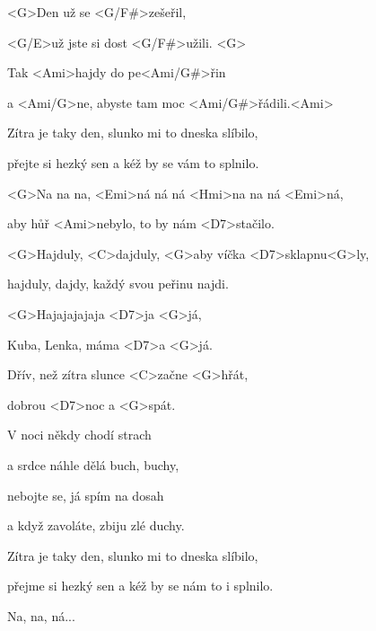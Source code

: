 

\zs
<G>Den už se <G/F#>zešeřil,

<G/E>už jste si dost <G/F#>užili. <G>

Tak <Ami>hajdy do pe<Ami/G#>řin

a <Ami/G>ne, abyste tam moc <Ami/G#>řádili.<Ami>

Zítra je taky den, slunko mi to dneska slíbilo,

přejte si hezký sen a kéž by se vám to splnilo.

<G>Na na na, <Emi>ná ná ná <Hmi>na na ná <Emi>ná,

aby hůř <Ami>nebylo, to by nám <D7>stačilo.
\ks

\zr
<G>Hajduly, <C>dajduly, <G>aby víčka 
<D7>sklapnu<G>ly, 

hajduly, dajdy, každý svou peřinu najdi.

<G>Hajajajajaja <D7>ja <G>já,

Kuba, Lenka, máma <D7>a <G>já.

Dřív, než zítra slunce <C>začne <G>hřát,

dobrou <D7>noc a <G>spát.
\kr

\zs
V noci někdy chodí strach

a srdce náhle dělá buch, buchy,

nebojte se, já spím na dosah

a když zavoláte, zbiju zlé duchy.

Zítra je taky den, slunko mi to dneska slíbilo,

přejme si hezký sen a kéž by se nám to i splnilo.

Na, na, ná...
\ks

\zr\kr

\kp






